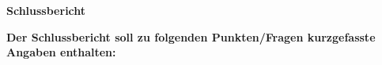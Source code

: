 \documentclass{article}
\begin{document}
\begin{center}
      \Large{\textbf{Schlussbericht}}\\
\end{center}



\noindent\textbf{\Large Der Schlussbericht soll zu folgenden Punkten/Fragen kurzgefasste Angaben enthalten:} \\ 


\end{document}
